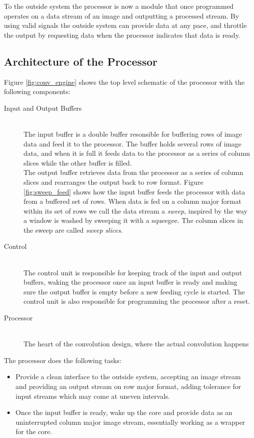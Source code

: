 To the outside system the processor is now a module that once programmed operates on a data stream of an image and outputting a processed stream. 
By using valid signals the outside system can provide data at any pace, and throttle the output by requesting data when the processor indicates that data is ready. 

\subsection{Architecture of the Processor}

Figure \ref{fig:conv_engine} shows the top level schematic of the processor with the following components:

\begin{description}
    \item[Input and Output Buffers] \hfill\\
        The input buffer is a double buffer resonsible for buffering rows of image data and feed it to the processor.
        The buffer holds several rows of image data, and when it is full it feeds data to the processor as a series of column slices while the other buffer is filled.\\
        The output buffer retrieves data from the processor as a series of column slices and rearranges the output back to row format.
        Figure \ref{fig:sweep_feed} shows how the input buffer feeds the processor with data from a buffered set of rows.
        When data is fed on a column major format within its set of rows we call the data stream a \textit{sweep}, inspired by the way a window is washed by sweeping it with a squeegee.
        The column slices in the sweep are called \textit{sweep slices}.
    \item[Control] \hfill\\
        The control unit is responsible for keeping track of the input and output buffers, waking the processor once an input buffer is ready and making sure the output buffer is empty before a new feeding cycle is started.
        The control unit is also responsible for programming the processor after a reset.
    \item[Processor] \hfill\\
        The heart of the convolution design, where the actual convolution happens
\end{description}

The processor does the following tasks:
\begin{itemize}
    \item Provide a clean interface to the outside system, accepting an image stream and providing an output stream on row major format, adding tolerance for input streams which may come at uneven intervals. 
    \item Once the input buffer is ready, wake up the core and provide data as an uninterrupted column major image stream, essentially working as a wrapper for the core.
\end{itemize}


